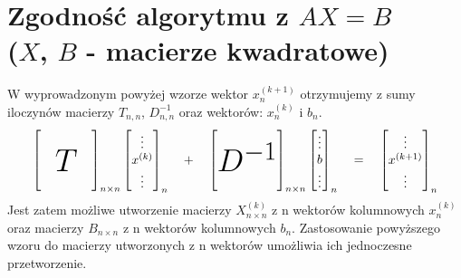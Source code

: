 \documentclass[a4paper,margin=1.54cm]{article}
\begin{document}
\section{Zgodność algorytmu z $AX = B$\\($X$, $B$ - macierze kwadratowe)}
W wyprowadzonym powyżej wzorze wektor $x^{(k+1)}_n$ otrzymujemy z sumy iloczynów macierzy $T_{n,n}$, $D^{-1}_{n,n}$ oraz wektorów: $x^{(k)}_n$ i $b_n$.
\[
\begin{bmatrix}
    \qquad\qquad \\
    \\
    \raisebox{0pt}[0pt][0pt]{\Huge $T$} \\
    \\
\end{bmatrix}_{n\times n}
\begin{bmatrix}
 \vdots\\
 x^{(k)}\\
 \vdots
\end{bmatrix}_{n}
\quad + \quad
\begin{bmatrix}
    \qquad\qquad \\
    \\
    \raisebox{0pt}[0pt][0pt]{\Huge $D^{-1}$} \\
    \\
\end{bmatrix}_{n\times n}
\begin{bmatrix}
 \vdots\\
 b\\
 \vdots
\end{bmatrix}_{n}
\quad = \quad
\begin{bmatrix}
 \vdots\\
 x^{(k+1)}\\
 \vdots
\end{bmatrix}_{n}
 \]
 Jest zatem możliwe utworzenie macierzy $X^{(k)}_{n\times n}$ z n wektorów kolumnowych $x^{(k)}_n$ oraz macierzy $B_{n\times n}$ z n wektorów kolumnowych $b_n$. Zastosowanie powyższego wzoru do macierzy utworzonych z n wektorów umożliwia ich jednoczesne przetworzenie.
\end{document}
